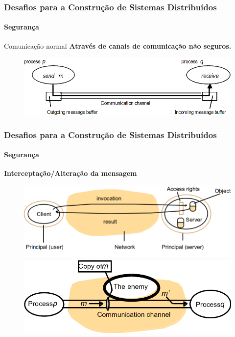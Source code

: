\documentclass[hyperref={pdfpagelabels=false},table]{beamer}
\begin{document}
\begin{frame}
    \frametitle{Desafios para a Construção de Sistemas Distribuídos}
    \framesubtitle{Segurança}	
	\begin{block}{Comunicação normal}
         \textbf{Através de canais de comunicação \alert{não seguros.}}
	\end{block}
	\begin{figure}
	  \centering
	  \includegraphics[scale=.4]{figs/seguranca1}
	\end{figure}
\end{frame}

\begin{frame}
    \frametitle{Desafios para a Construção de Sistemas Distribuídos}
    \framesubtitle{Segurança}	
	\begin{block}{}
         \textbf{Interceptação/Alteração da mensagem}
	\end{block}
	\begin{figure}
	  \centering
	  \includegraphics[scale=.3]{figs/seguranca2} \\

	  \includegraphics[scale=.3]{figs/seguranca3}
	\end{figure}
\end{frame}
\end{document}
